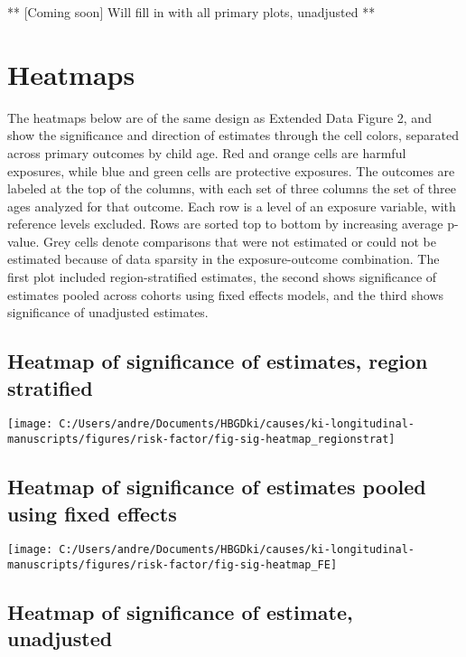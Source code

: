 \documentclass[9pt,]{book}
\begin{document}
\raggedright

** {[}Coming soon{]} Will fill in with all primary plots, unadjusted **

\chapter{Heatmaps}\label{heatmaps}

\raggedright

The heatmaps below are of the same design as Extended Data Figure 2, and
show the significance and direction of estimates through the cell
colors, separated across primary outcomes by child age. Red and orange
cells are harmful exposures, while blue and green cells are protective
exposures. The outcomes are labeled at the top of the columns, with each
set of three columns the set of three ages analyzed for that outcome.
Each row is a level of an exposure variable, with reference levels
excluded. Rows are sorted top to bottom by increasing average p-value.
Grey cells denote comparisons that were not estimated or could not be
estimated because of data sparsity in the exposure-outcome combination.
The first plot included region-stratified estimates, the second shows
significance of estimates pooled across cohorts using fixed effects
models, and the third shows significance of unadjusted estimates.

\section{Heatmap of significance of estimates, region
stratified}\label{heatmap-of-significance-of-estimates-region-stratified}

\texttt{[image: C:/Users/andre/Documents/HBGDki/causes/ki-longitudinal-manuscripts/figures/risk-factor/fig-sig-heatmap\_regionstrat]}

\section{Heatmap of significance of estimates pooled using fixed
effects}\label{heatmap-of-significance-of-estimates-pooled-using-fixed-effects}

\texttt{[image: C:/Users/andre/Documents/HBGDki/causes/ki-longitudinal-manuscripts/figures/risk-factor/fig-sig-heatmap\_FE]}

\section{Heatmap of significance of estimate,
unadjusted}\label{heatmap-of-significance-of-estimate-unadjusted}
\end{document}
